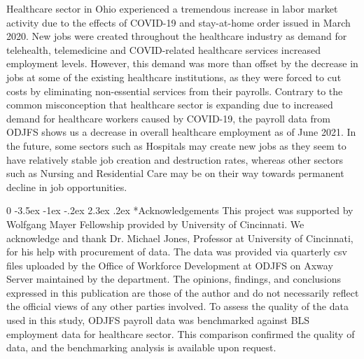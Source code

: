 \documentclass[11pt]{article}
\makeatletter
\newcommand{\blind}{0}
\renewcommand\section{\@startsection {section}{1}{\z@}%
                                       {-3.5ex \@plus -1ex \@minus -.2ex}%
                                       {2.3ex \@plus.2ex}%
                                       {\normalfont\fontfamily{phv}\fontsize{16}{19}\bfseries}}
\makeatother
\begin{document}
Healthcare sector in Ohio experienced a tremendous increase in labor market activity due to the effects of COVID-19 and stay-at-home order issued in March 2020. New jobs were created throughout the healthcare industry as demand for telehealth, telemedicine and COVID-related healthcare services increased employment levels. However, this demand was more than offset by the decrease in jobs at some of the existing healthcare institutions, as they were forced to cut costs by eliminating non-essential services from their payrolls. Contrary to the common misconception that healthcare sector is expanding due to increased demand for healthcare workers caused by COVID-19, the payroll data from ODJFS shows us a decrease in overall healthcare employment as of June 2021. In the future, some sectors such as Hospitals may create new jobs as they seem to have relatively stable job creation and destruction rates, whereas other sectors such as Nursing and Residential Care may be on their way towards permanent decline in job opportunities. 



\blind{
\section*{Acknowledgements}
This project was supported by Wolfgang Mayer Fellowship provided by University of Cincinnati. We acknowledge and thank Dr. Michael Jones, Professor at University of Cincinnati, for his help with procurement of data. The data was provided via quarterly csv files uploaded by the Office of Workforce Development at ODJFS on Axway Server maintained by the department. The opinions, findings, and conclusions expressed in this publication are those of the author and do not necessarily reflect the official views of any other parties involved. To assess the quality of the data used in this study, ODJFS payroll data was benchmarked against BLS employment data for healthcare sector. This comparison confirmed the quality of data, and the benchmarking analysis is available upon request.	} \fi



	
\end{document}
